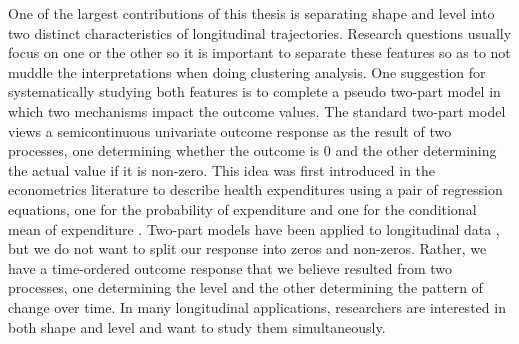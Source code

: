 One of the largest contributions of this thesis is separating shape and level into two distinct characteristics of longitudinal trajectories. Research questions usually focus on one or the other so it is important to separate these features so as to not muddle the interpretations when doing clustering analysis. One suggestion for systematically studying both features is to complete a pseudo two-part model in which two mechanisms impact the outcome values. The standard two-part model views a semicontinuous univariate outcome response as the result of two processes, one determining whether the outcome is 0 and the other determining the actual value if it is non-zero. This idea was first introduced in the econometrics literature to describe health expenditures using a pair of regression equations, one for the probability of expenditure and one for the conditional mean of expenditure  \cite{duan1983, manning1981}. Two-part models have been applied to longitudinal data \cite{olsen2001}, but we do not want to split our response into zeros and non-zeros. Rather, we have a time-ordered outcome response that we believe resulted from two processes, one determining the level and the other determining the pattern of change over time.  In many longitudinal applications, researchers are interested in both shape and level and want to study them simultaneously.


